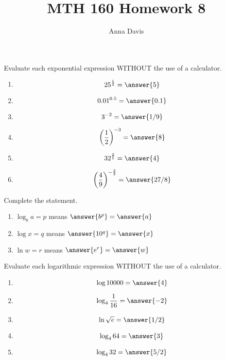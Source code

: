 \documentclass{ximera}
\author{Anna Davis} \title{MTH 160 Homework 8}
\begin{document}
\begin{abstract}

\end{abstract}
\maketitle
 


\begin{problem}\label{prob:160hom7prob7}
Evaluate each exponential expression WITHOUT the use of a calculator.  
\begin{enumerate}
    \item $$25^{\frac{1}{2}}=\answer{5}$$
    \item $$0.01^{0.5}=\answer{0.1}$$
    \item $$3^{-2}=\answer{1/9}$$
    \item $$\left(\frac{1}{2}\right)^{-3}=\answer{8}$$
    \item $$32^{\frac{2}{5}}=\answer{4}$$
    \item $$\left(\frac{4}{9}\right)^{-\frac{3}{2}}=\answer{27/8}$$
\end{enumerate}
\end{problem}

\begin{problem}\label{prob:160hom7prob8}
Complete the statement.
 \begin{enumerate}
     \item 
 $\log_b a=p$ means $\answer{b^p}=\answer{a}$
 \item
 $\log x=q$ means $\answer{10^q}=\answer{x}$
 \item
 $\ln w=r$ means $\answer{e^r}=\answer{w}$
 \end{enumerate}
 \end{problem}
 
 \begin{problem}\label{prob:160hom7prob9}
 Evaluate each logarithmic expression WITHOUT the use of a calculator.
 \begin{enumerate}
     \item $$\log 10000=\answer{4}$$
     \item $$\log_4\frac{1}{16}=\answer{-2}$$
     \item $$\ln\sqrt{e}=\answer{1/2}$$
     \item $$\log_4 64=\answer{3}$$
     \item $$\log_4 32=\answer{5/2}$$
 \end{enumerate}
 \end{problem}
 
\end{document}
